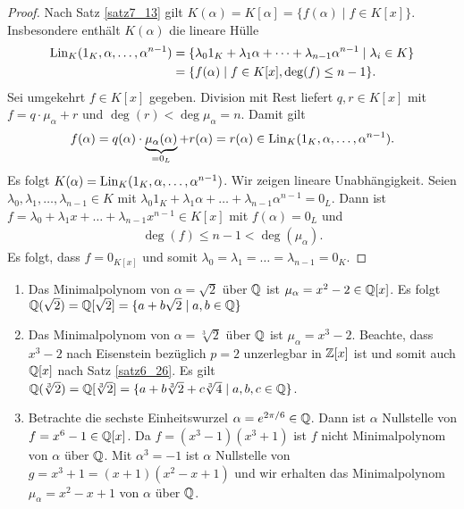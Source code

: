 \begin{proof}
	Nach Satz \ref{satz7_13} gilt $K(\alpha) = K[\alpha] = \{f(\alpha) \mid f \in K[x]\}$. Insbesondere enthält $K(\alpha)$ die lineare Hülle 
	\begin{align*}
		\operatorname{Lin}_K(1_K, \alpha, \dots, \alpha^{n-1}) &= \{\lambda_0 1_K + \lambda_1 \alpha + \dots + \lambda_{n-1} \alpha^{n-1} \mid \lambda_i \in K\}\\
		&= \{f(\alpha) \mid f \in K[x], \deg(f) \leq n - 1\}.
	\end{align*}
	Sei umgekehrt $f \in K[x]$ gegeben. Division mit Rest liefert $q,r \in K[x]$ mit $f = q \cdot \mu_\alpha + r$ und $\deg(r) < \deg{\mu_\alpha} = n$. Damit gilt 
	\begin{align*}
		f(\alpha) = q(\alpha) \cdot \underbrace{\mu_{\alpha}(\alpha)}_{=0_L} + r(\alpha) = r(\alpha) \in \operatorname{Lin}_K(1_K, \alpha, \dots, \alpha^{n-1}).
	\end{align*}
	Es folgt $K(\alpha) = \operatorname{Lin}_K(1_K, \alpha, \dots, \alpha^{n-1})$. Wir zeigen lineare Unabhängigkeit. Seien $\lambda_0, \lambda_1, \dots, \lambda_{n-1} \in K$ mit $\lambda_0 1_K + \lambda_1 \alpha + \dots + \lambda_{n-1} \alpha^{n-1} = 0_L$. Dann ist $f = \lambda_0 + \lambda_1 x + \dots + \lambda_{n-1} x^{n-1} \in K[x]$ mit $f(\alpha) = 0_L$ und 
	\begin{align*}
		\deg(f) \leq n - 1 < \deg(\mu_\alpha).
	\end{align*}
	Es folgt, dass $f = 0_{K[x]}$ und somit $\lambda_0 = \lambda_1 = \dots = \lambda_{n-1} = 0_K$. 
\end{proof}
\begin{beispiel}\label{beispiel7_15}
	\begin{enumerate}[label=(\arabic*)]
		\item Das Minimalpolynom von $\alpha = \sqrt{2}$ über $\mathbb{Q}$ ist $\mu_\alpha = x^2 - 2 \in \mathbb{Q}[x]$. Es folgt $\mathbb{Q}(\sqrt{2}) = \mathbb{Q}[\sqrt{2}] = \{a + b\sqrt{2} \mid a,b \in \mathbb{Q}\}$
		\item Das Minimalpolynom von $\alpha = \sqrt[3]{2}$ über $\mathbb{Q}$ ist $\mu_\alpha = x^3 - 2$. Beachte, dass $x^3 - 2$ nach Eisenstein bezüglich $p=2$ unzerlegbar in $\mathbb{Z}[x]$ ist und somit auch $\mathbb{Q}[x]$ nach Satz \ref{satz6_26}. Es gilt $\mathbb{Q}(\sqrt[3]{2}) = \mathbb{Q}[\sqrt[3]{2}] = \{a + b\sqrt[3]{2} + c\sqrt[3]{4} \mid a,b,c \in \mathbb{Q}\}$.
		\item Betrachte die sechste Einheitswurzel $\alpha = e^{2\pi/6} \in \mathbb{Q}$. Dann ist $\alpha$ Nullstelle von $f=x^6 - 1 \in \mathbb{Q}[x]$. Da $f = (x^3 - 1)(x^3 + 1)$ ist $f$ nicht Minimalpolynom von $\alpha$ über $\mathbb{Q}$. Mit $\alpha^3 = -1$ ist $\alpha$ Nullstelle von $g = x^3 + 1 = (x+1)(x^2 - x + 1)$ und wir erhalten das Minimalpolynom $\mu_\alpha = x^2 - x + 1$ von $\alpha$ über $\mathbb{Q}$.
	\end{enumerate}
\end{beispiel}
